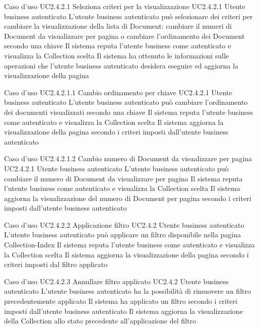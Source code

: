 \UCtitle
{Caso d'uso UC2.4.2.1}
{Seleziona criteri per la visualizzazione}
\UC
{UC2.4.2.1}
{Utente business autenticato}
{L'utente business autenticato può selezionare dei criteri per cambiare la visualizzazione della lista di Document: cambiare il numeri di Document da visualizzare per pagina o cambiare l'ordinamento dei Document secondo una chiave}
{Il sistema reputa l'utente business come autenticato e visualizza la Collection scelta}
\post
{Il sistema ha ottenuto le informazioni sulle operazioni che l'utente business autenticato desidera eseguire ed aggiorna la visualizzazione della pagina}


\UCtitle
{Caso d'uso UC2.4.2.1.1}
{Cambio ordinamento per chiave}
\UC
{UC2.4.2.1}
{Utente business autenticato}
{L'utente business autenticato può cambiare l'ordinamento dei documenti visualizzati secondo una chiave}
{Il sistema reputa l'utente business come autenticato e visualizza la Collection scelta}
\post
{Il sistema aggiorna la visualizzazione della pagina secondo i criteri imposti dall'utente business autenticato}


\UCtitle
{Caso d'uso UC2.4.2.1.2}
{Cambio numero di Document da visualizzare per pagina}
\UC
{UC2.4.2.1}
{Utente business autenticato}
{L'utente business autenticato può cambiare il numero di Document da visualizzare per pagina}
{Il sistema reputa l'utente business come autenticato e visualizza la Collection scelta}
\post
{Il sistema aggiorna la visualizzazione del numero di Document per pagina secondo i criteri imposti dall'utente business autenticato}

\UCtitle
{Caso d'uso UC2.4.2.2}
{Applicazione filtro}
\UC
{UC2.4.2}
{Utente business autenticato}
{L'utente business autenticato può applicare un filtro disponibile nella pagina Collection-Index}
{Il sistema reputa l'utente business come autenticato e visualizza la Collection scelta}
\post
{Il sistema aggiorna la visualizzazione della pagina secondo i criteri imposti dal filtro applicato}

\UCtitle
{Caso d'uso UC2.4.2.3}
{Annullare filtro applicato}
\UC
{UC2.4.2}
{Utente business autenticato}
{L'utente business autenticato ha la possibilità di rimuovere un filtro precedentemente applicato}
{Il sistema ha applicato un filtro secondo i criteri imposti dall'utente business autenticato}
\post
{Il sistema aggiorna la visualizzazione della Collection allo stato precedente all'applicazione del filtro}


